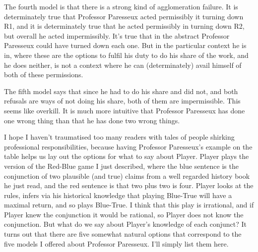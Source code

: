 \documentclass[
  10pt,
  letterpaper,
  twoside]{scrbook}
\begin{document}
The fourth model is that there is a strong kind of agglomeration
failure. It is determinately true that Professor Paresseux acted
permissibly it turning down R1, and it is determinately true that he
acted permissibly in turning down R2, but overall he acted
impermissibly. It's true that in the abstract Professor Paresseux could
have turned down each one. But in the particular context he is in, where
these are the options to fulfil his duty to do his share of the work,
and he does neither, is not a context where he can (determinately) avail
himself of both of these permissions.

The fifth model says that since he had to do his share and did not, and
both refusals are ways of not doing his share, both of them are
impermissible. This seems like overkill. It is much more intuitive that
Professor Paresseux has done one wrong thing than that he has done two
wrong things.

I hope I haven't traumatised too many readers with tales of people
shirking professional responsibilities, because having Professor
Paresseux's example on the table helps us lay out the options for what
to say about Player. Player plays the version of the Red-Blue game I
just described, where the blue sentence is the conjunction of two
plausible (and true) claims from a well regarded history book he just
read, and the red sentence is that two plus two is four. Player looks at
the rules, infers via his historical knowledge that playing Blue-True
will have a maximal return, and so plays Blue-True. I think that this
play is irrational, and if Player knew the conjunction it would be
rational, so Player does not know the conjunction. But what do we say
about Player's knowledge of each conjunct? It turns out that there are
five somewhat natural options that correspond to the five models I
offered about Professor Paresseux. I'll simply list them here.
\end{document}
